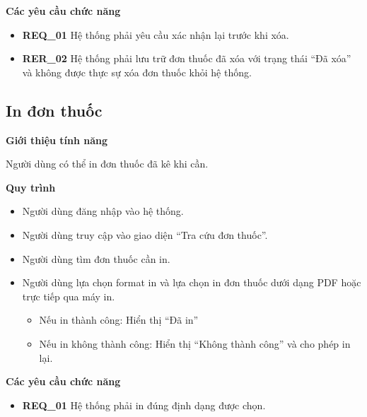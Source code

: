 \noindent \textbf{Các yêu cầu chức năng}
\begin{itemize}
  \item \textbf{REQ\_01} Hệ thống phải yêu cầu xác nhận lại trước khi xóa.
  \item \textbf{RER\_02} Hệ thống phải lưu trữ đơn thuốc đã xóa với trạng thái ``Đã xóa'' và không được thực sự xóa đơn thuốc khỏi hệ thống.
\end{itemize}

\subsection{In đơn thuốc}

\noindent \textbf{Giới thiệu tính năng}

Người dùng có thể in đơn thuốc đã kê khi cần.

\noindent \textbf{Quy trình}
\begin{itemize}
  \item Người dùng đăng nhập vào hệ thống.
  \item Người dùng truy cập vào giao diện ``Tra cứu đơn thuốc''.
  \item Người dùng tìm đơn thuốc cần in.
  \item Người dùng lựa chọn format in và lựa chọn in đơn thuốc dưới dạng PDF hoặc trực tiếp qua máy in.
    \begin{itemize}
      \item Nếu in thành công: Hiển thị ``Đã in''
      \item Nếu in không thành công: Hiển thị ``Không thành công'' và cho phép in lại.
    \end{itemize}
\end{itemize}

\noindent \textbf{Các yêu cầu chức năng}
\begin{itemize}
  \item \textbf{REQ\_01} Hệ thống phải in đúng định dạng được chọn.
\end{itemize}
